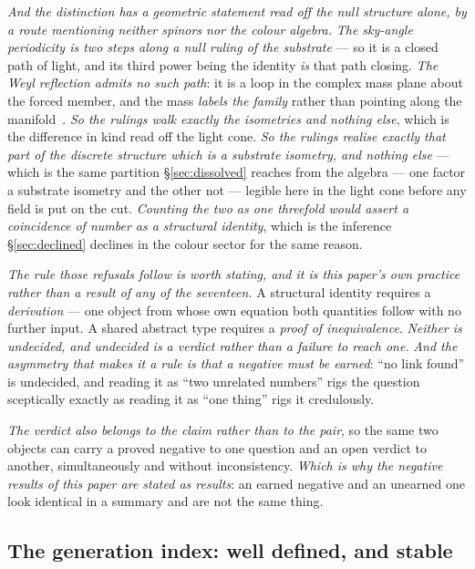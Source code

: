 \documentclass[11pt,a4paper]{article}
\theoremstyle{plain}
\theoremstyle{definition}
\begin{document}
\emph{And the distinction has a geometric statement read off the null structure alone, by a route mentioning
neither spinors nor the colour algebra.} \emph{The sky-angle periodicity is two steps along a null ruling of
the substrate} --- so it is a closed path of light, and its third power being the identity \emph{is} that path
closing. \emph{The Weyl reflection admits no such path}: it is a loop in the complex mass plane about the
forced member, and the mass \emph{labels the family} rather than pointing along the
manifold~\cite{JanzenAlgebroid,JanzenGroupoid}. \emph{So the rulings walk exactly the isometries and nothing
else}, which is the difference in kind read off the light cone. \emph{So the rulings realise exactly that part of the
discrete structure which is a substrate isometry, and nothing else} --- which is the same partition
\S\ref{sec:dissolved} reaches from the algebra --- one factor a substrate isometry and the other not ---
legible here in the light cone before any field is put on the cut. \emph{Counting the two as one threefold would assert a coincidence of number
as a structural identity}, which is the inference \S\ref{sec:declined} declines in the colour sector for the
same reason.

\emph{The rule those refusals follow is worth stating, and it is this paper's own practice rather than a
result of any of the seventeen.} A structural identity requires a \emph{derivation} --- one object from whose own
equation both quantities follow with no further input. A shared abstract type requires a \emph{proof of
inequivalence}. \emph{Neither is undecided, and undecided is a verdict rather than a failure to
reach one.} \emph{And the asymmetry that makes it a rule is that a negative must be earned}: ``no link
found'' is undecided, and reading it as ``two unrelated numbers'' rigs the question sceptically exactly as
reading it as ``one thing'' rigs it credulously.

\emph{The verdict also belongs to the claim rather than to the pair}, so the same two objects can carry a
proved negative to one question and an open verdict to another, simultaneously and without
inconsistency. \emph{Which is why the negative results of this paper are stated as results}: an earned
negative and an unearned one look identical in a summary and are not the same thing.

\subsection{The generation index: well defined, and stable}
\end{document}
